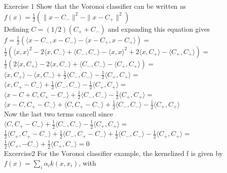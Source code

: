 \documentclass[18pt]{article}
\author{Adam Handwerger}
\begin{document}
\begin{flushleft}
Exercise 1
\vspace{.4cm}
Show that the Voronoi classifier can be written as\\
$f(x)=\frac{1}{2}\left(\parallel x-C_{-} \parallel^2-\parallel x-C_{+}\parallel^2\right)$\\
\vspace{.4cm}
Defining $C = (1/2) \left( C_{+} + C_{-} \right)$ and expanding this equation gives\\
\vspace{.4cm}
$f=\frac{1}{2} \left( \langle x-C_{-},x-C_{-}\rangle - \langle x-C_{+},x-C_{+}\rangle\right)=$
    $\frac{1}{2}\left( \langle x,x \rangle^2 -2 \langle x,C_{-} \rangle + \langle C_{-},C_{-}\rangle-\langle x,x \rangle^2 +2\langle x,C_{+} \rangle-\langle C_{+},C_{+}\rangle\right)=$\\
    $\frac{1}{2}\left(2\langle x,C_{+}\rangle-2\langle x,C_{-}\rangle+\langle C_{-},C_{-}\rangle-\langle C_{+},C_{+}\rangle\right)=$\\
    $\langle x,C_{+} \rangle - \langle x,C_{-}\rangle+ \frac{1}{2}\langle C_{-},C_{-}\rangle-\frac{1}{2}\langle C_{+},C_{+}\rangle=$\\
    $\langle x, C_{+}-C_{-} \rangle +\frac{1}{2}\langle C_{-},C_{-}\rangle-\frac{1}{2}\langle C_{+},C_{+}\rangle=$\\
    $\langle x-C+C,C_{+}-C_{-}\rangle+\frac{1}{2}\langle C_{-},C_{-}\rangle-\frac{1}{2}\langle C_{+},C_{+}\rangle=$\\
    $\langle x-C,C_{+}-C_{-}\rangle+ \langle C,C_{+}-C_{-}\rangle+\frac{1}{2}\langle C_{-},C_{-}\rangle-\frac{1}{2}\langle C_{+},C_{+}\rangle$\\
\vspace{.4cm}
Now the last two terms cancell since\\
$\langle C,C_{+}-C_{-}\rangle+\frac{1}{2}\langle C_{-},C_{-}\rangle-\frac{1}{2}\langle C_{+},C_{+}\rangle=$\\
$\frac{1}{2} \langle C_{+}, C_{+}-C_{-} \rangle + \frac{1}{2} \langle C_{-}, C_{+}-C_{-} \rangle+\frac{1}{2}\langle C_{-},C_{-}\rangle-\frac{1}{2} \langle C_{+},C_{+}\rangle=$\\
$\frac{1}{2}\langle C_{+}, -C_{-}\rangle + \frac{1}{2} \langle C_{+}, C_{-}\rangle=0$\\
\vspace{.4cm}
Excercise2
\vspace{.4cm}
For the Voronoi classifier example, the kernelized f is given by\\
$f(x)=\sum_i \alpha_i k(x,x_i)$, with



\end{flushleft}
\end{document}
